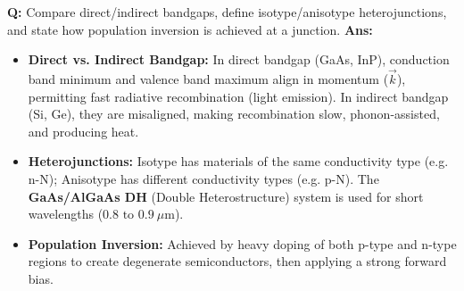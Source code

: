 \documentclass[10pt,a4paper,twocolumn]{article}
\begin{document}
\begin{tcolorbox}[
  colback=white,
  colframe=UnitColorFour,
  colbacktitle=gray!10!white,
  coltitle=black,
  fonttitle=\bfseries\sffamily\small,
  title={Unit IV $\bullet$ Card 10: Semiconductor Source Materials and Junction Physics},
  boxrule=1.2pt,
  arc=2mm,
  outer arc=2mm,
  boxsep=1.5mm,
  top=1mm,
  bottom=1mm,
  left=1.5mm,
  right=1.5mm,
  before skip=2.5mm,
  after skip=2.5mm
]
\textbf{Q:} Compare direct/indirect bandgaps, define isotype/anisotype heterojunctions, and state how population inversion is achieved at a junction.
\tcbline
\textbf{Ans:} \begin{itemize}
  \item   \textbf{Direct vs. Indirect Bandgap:} In direct bandgap (GaAs, InP), conduction band minimum and valence band maximum align in momentum ($\vec{k}$), permitting fast radiative recombination (light emission). In indirect bandgap (Si, Ge), they are misaligned, making recombination slow, phonon-assisted, and producing heat.
  \item   \textbf{Heterojunctions:} Isotype has materials of the same conductivity type (e.g. n-N); Anisotype has different conductivity types (e.g. p-N). The \textbf{GaAs/AlGaAs DH} (Double Heterostructure) system is used for short wavelengths ($0.8\text{ to } 0.9\ \mu\text{m}$).
  \item   \textbf{Population Inversion:} Achieved by heavy doping of both p-type and n-type regions to create degenerate semiconductors, then applying a strong forward bias.
\end{itemize}
\end{tcolorbox}
\end{document}

